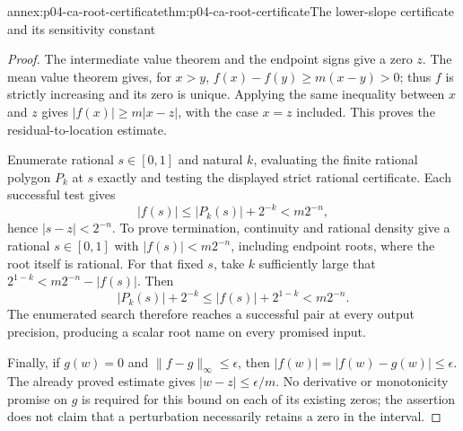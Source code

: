 \begin{annexitem}{annex:p04-ca-root-certificate}{thm:p04-ca-root-certificate}{The lower-slope certificate and its sensitivity constant}
\begin{proof}
The intermediate value theorem and the endpoint signs give a zero
\(z\). The mean value theorem gives, for \(x>y\),
\(f(x)-f(y)\geq m(x-y)>0\); thus \(f\) is strictly increasing
and its zero is unique. Applying the same inequality between \(x\)
and \(z\) gives \(|f(x)|\geq m|x-z|\), with the case \(x=z\)
included. This proves the residual-to-location estimate.

Enumerate rational \(s\in[0,1]\) and natural \(k\), evaluating
the finite rational polygon \(P_k\) at \(s\) exactly and testing
the displayed strict rational certificate. Each successful test gives
\[
 |f(s)|\leq|P_k(s)|+2^{-k}<m2^{-n},
\]
hence \(|s-z|<2^{-n}\).
To prove termination, continuity and rational density give a rational
\(s\in[0,1]\) with \(|f(s)|<m2^{-n}\), including endpoint
roots, where the root itself is rational. For that fixed \(s\), take
\(k\) sufficiently large that
\(2^{1-k}<m2^{-n}-|f(s)|\). Then
\[
 |P_k(s)|+2^{-k}
 \leq |f(s)|+2^{1-k}<m2^{-n}.
\]
The enumerated search therefore reaches a successful pair at every
output precision, producing a scalar root name on every promised input.

Finally, if \(g(w)=0\) and \(\lVert f-g\rVert_\infty\leq\epsilon\),
then \(|f(w)|=|f(w)-g(w)|\leq\epsilon\).
The already proved estimate gives \(|w-z|\leq\epsilon/m\).
No derivative or monotonicity promise on \(g\) is required for this
bound on each of its existing zeros; the assertion does not claim that
a perturbation necessarily retains a zero in the interval.
\end{proof}
\end{annexitem}
